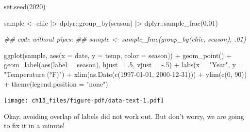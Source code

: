 \documentclass[
  letterpaper,
]{scrbook}
\newenvironment{Shaded}{\begin{snugshade}}{\end{snugshade}}
\newcommand{\AttributeTok}[1]{\textcolor[rgb]{0.40,0.45,0.13}{#1}}
\newcommand{\DecValTok}[1]{\textcolor[rgb]{0.68,0.00,0.00}{#1}}
\newcommand{\DocumentationTok}[1]{\textcolor[rgb]{0.37,0.37,0.37}{\textit{#1}}}
\newcommand{\FloatTok}[1]{\textcolor[rgb]{0.68,0.00,0.00}{#1}}
\newcommand{\FunctionTok}[1]{\textcolor[rgb]{0.28,0.35,0.67}{#1}}
\newcommand{\NormalTok}[1]{\textcolor[rgb]{0.00,0.23,0.31}{#1}}
\newcommand{\OtherTok}[1]{\textcolor[rgb]{0.00,0.23,0.31}{#1}}
\newcommand{\SpecialCharTok}[1]{\textcolor[rgb]{0.37,0.37,0.37}{#1}}
\newcommand{\StringTok}[1]{\textcolor[rgb]{0.13,0.47,0.30}{#1}}
\begin{document}
\begin{Shaded}
\begin{Highlighting}[]
\FunctionTok{set.seed}\NormalTok{(}\DecValTok{2020}\NormalTok{)}

\NormalTok{sample }\OtherTok{\textless{}{-}}\NormalTok{ chic }\SpecialCharTok{|\textgreater{}}
\NormalTok{  dplyr}\SpecialCharTok{::}\FunctionTok{group\_by}\NormalTok{(season) }\SpecialCharTok{|\textgreater{}}
\NormalTok{  dplyr}\SpecialCharTok{::}\FunctionTok{sample\_frac}\NormalTok{(}\FloatTok{0.01}\NormalTok{)}

\DocumentationTok{\#\# code without pipes:}
\DocumentationTok{\#\# sample \textless{}{-} sample\_frac(group\_by(chic, season), .01)}

\FunctionTok{ggplot}\NormalTok{(sample, }\FunctionTok{aes}\NormalTok{(}\AttributeTok{x =}\NormalTok{ date, }\AttributeTok{y =}\NormalTok{ temp, }\AttributeTok{color =}\NormalTok{ season)) }\SpecialCharTok{+}
  \FunctionTok{geom\_point}\NormalTok{() }\SpecialCharTok{+}
  \FunctionTok{geom\_label}\NormalTok{(}\FunctionTok{aes}\NormalTok{(}\AttributeTok{label =}\NormalTok{ season), }\AttributeTok{hjust =}\NormalTok{ .}\DecValTok{5}\NormalTok{, }\AttributeTok{vjust =} \SpecialCharTok{{-}}\NormalTok{.}\DecValTok{5}\NormalTok{) }\SpecialCharTok{+}
  \FunctionTok{labs}\NormalTok{(}\AttributeTok{x =} \StringTok{"Year"}\NormalTok{, }\AttributeTok{y =} \StringTok{"Temperature (°F)"}\NormalTok{) }\SpecialCharTok{+}
  \FunctionTok{xlim}\NormalTok{(}\FunctionTok{as.Date}\NormalTok{(}\FunctionTok{c}\NormalTok{(}\StringTok{\textquotesingle{}1997{-}01{-}01\textquotesingle{}}\NormalTok{, }\StringTok{\textquotesingle{}2000{-}12{-}31\textquotesingle{}}\NormalTok{))) }\SpecialCharTok{+}
  \FunctionTok{ylim}\NormalTok{(}\FunctionTok{c}\NormalTok{(}\DecValTok{0}\NormalTok{, }\DecValTok{90}\NormalTok{)) }\SpecialCharTok{+}
  \FunctionTok{theme}\NormalTok{(}\AttributeTok{legend.position =} \StringTok{"none"}\NormalTok{)}
\end{Highlighting}
\end{Shaded}

\texttt{[image: ch13\_files/figure-pdf/data-text-1.pdf]}

Okay, avoiding overlap of labels did not work out. But don't worry, we
are going to fix it in a minute!
\end{document}
